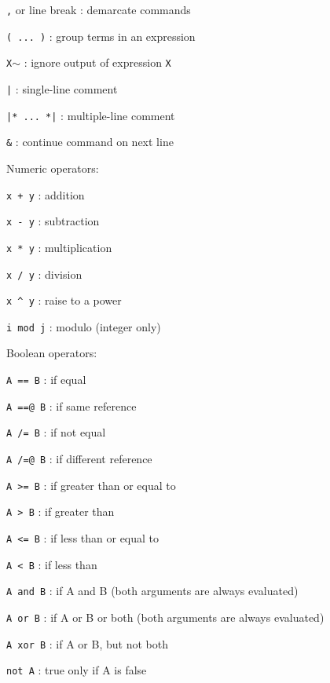 \documentclass{article}
\begin{document}
\noindent
\begin{description}
\item{\verb#,# or line break} :  demarcate commands
\item{\verb#( ... )#} :  group terms in an expression
\item{\verb#X#$\sim$} :  ignore output of expression \verb#X#
\item{\verb#|#} :  single-line comment
\item{\verb#|* ... *|#} :  multiple-line comment
\item{\verb#&#} :  continue command on next line\\
\end{description}

\noindent
Numeric operators:
\begin{description}
\item{\verb#x + y#} :  addition
\item{\verb#x - y#} :  subtraction
\item{\verb#x * y#} :  multiplication
\item{\verb#x / y#} :  division
\item{\verb#x ^ y#} :  raise to a power
\item{\verb#i mod j#} :  modulo (integer only)\\
\end{description}

\noindent
Boolean operators:
\begin{description}
\item{\verb#A == B#} :  if equal
\item{\verb#A ==@ B#} :  if same reference
\item{\verb#A /= B#} :  if not equal
\item{\verb#A /=@ B#} :  if different reference
\item{\verb#A >= B#} :  if greater than or equal to
\item{\verb#A > B#} :  if greater than
\item{\verb#A <= B#} :  if less than or equal to
\item{\verb#A < B#} :  if less than
\item{\verb#A and B#} :  if A and B (both arguments are always evaluated)
\item{\verb#A or B#} :  if A or B or both (both arguments are always evaluated)
\item{\verb#A xor B#} :  if A or B, but not both
\item{\verb#not A#} :  true only if A is false\\
\end{description}
\end{document}
